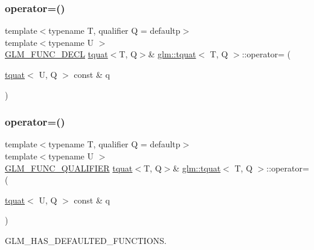 \mbox{\label{structglm_1_1tquat_ab460ca35b5d2a4afe8fc79106943f456}} 
\subsubsection{\texorpdfstring{operator=()}{operator=()}\hspace{0.1cm}{\footnotesize\ttfamily [2/3]}}
{\footnotesize\ttfamily template$<$typename T, qualifier Q = defaultp$>$ \\
template$<$typename U $>$ \\
\hyperlink{setup_8hpp_ab2d052de21a70539923e9bcbf6e83a51}{G\+L\+M\+\_\+\+F\+U\+N\+C\+\_\+\+D\+E\+CL} \hyperlink{structglm_1_1tquat}{tquat}$<$T, Q$>$\& \hyperlink{structglm_1_1tquat}{glm\+::tquat}$<$ T, Q $>$\+::operator= (\begin{DoxyParamCaption}\item[{\hyperlink{structglm_1_1tquat}{tquat}$<$ U, Q $>$ const \&}]{q }\end{DoxyParamCaption})}

\mbox{\label{structglm_1_1tquat_abbfc6f4a48d94487207b0aef77a2809c}} 
\subsubsection{\texorpdfstring{operator=()}{operator=()}\hspace{0.1cm}{\footnotesize\ttfamily [3/3]}}
{\footnotesize\ttfamily template$<$typename T, qualifier Q = defaultp$>$ \\
template$<$typename U $>$ \\
\hyperlink{setup_8hpp_a33fdea6f91c5f834105f7415e2a64407}{G\+L\+M\+\_\+\+F\+U\+N\+C\+\_\+\+Q\+U\+A\+L\+I\+F\+I\+ER} \hyperlink{structglm_1_1tquat}{tquat}$<$T, Q$>$\& \hyperlink{structglm_1_1tquat}{glm\+::tquat}$<$ T, Q $>$\+::operator= (\begin{DoxyParamCaption}\item[{\hyperlink{structglm_1_1tquat}{tquat}$<$ U, Q $>$ const \&}]{q }\end{DoxyParamCaption})}



G\+L\+M\+\_\+\+H\+A\+S\+\_\+\+D\+E\+F\+A\+U\+L\+T\+E\+D\+\_\+\+F\+U\+N\+C\+T\+I\+O\+NS. 

